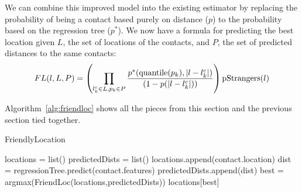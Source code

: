 We can combine this improved model into the existing estimator by
replacing the probability of being a contact based purely on distance ($p$) to
the probability based on the regression tree ($p^*$).
%
We now have a formula for predicting the best location given $L$, the set of
locations of the contacts, and $P$, the set of predicted distances to the same
contacts:
\[
    FL(l,L,P) =
        \left(
            \prod_{l^c_k \in L,p_k \in P}
            {p^*(\operatorname{quantile}(p_k),|l-l^c_k|) \over (1-p(|l-l^c_k|))}
        \right)
        \operatorname{pStrangers}(l)
\]


Algorithm~\ref{alg:friendloc} shows all the pieces from this section and the
previous section tied together.

\begin{algorithm}
  \caption{FriendlyLocation \label{alg:friendloc}}
  \begin{algorithmic}[0]
  \State locations = list()
  \State predictedDists = list()
        \State \Continue
      \EndIf
      \State locations.append(contact.location)
      \State dist = regressionTree.predict(contact.features)
      \State predictedDists.append(dist)
  \EndFor
  \State best = argmax(FriendLoc(locations,predictedDists))
  \State \Return locations[best]
  \end{algorithmic}
\end{algorithm}


